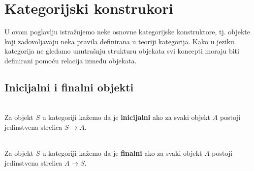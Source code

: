     \begin{center}
    \end{center}
    
  \newpage
  \section{Kategorijski konstrukori}
  U ovom poglavlju istražujemo neke osnovne kategorijske
  konstruktore, tj. objekte koji zadovoljavaju neka pravila definirana u teoriji
  kategorija. Kako u jeziku kategorija ne gledamo unutrašnju strukturu objekata
  svi koncepti moraju biti definirani pomoću relacija između objekata.
  \subsection{Inicijalni i finalni objekti}

  \begin{definition}\ \\
  
    \noindent Za objekt $S$ u kategoriji  kažemo da je \textbf{inicijalni} ako za svaki
    objekt $A$ postoji jedinstvena strelica $S \xrightarrow{} A$.\\
  \end{definition}
  
  \begin{definition}\ \\
  
    \noindent Za objekt $S$ u kategoriji  kažemo da je \textbf{finalni} ako za svaki
    objekt $A$ postoji jedinstvena strelica $A \xrightarrow{} S$.\\
  \end{definition}
  
